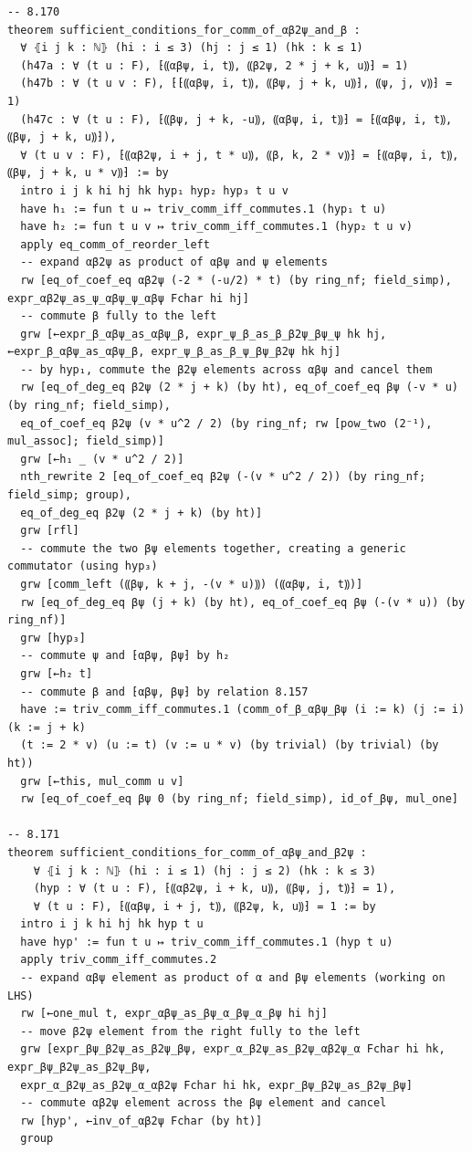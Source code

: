 \begin{Verbatim}
-- 8.170
theorem sufficient_conditions_for_comm_of_αβ2ψ_and_β :
  ∀ ⦃i j k : ℕ⦄ (hi : i ≤ 3) (hj : j ≤ 1) (hk : k ≤ 1)
  (h47a : ∀ (t u : F), ⁅⸨αβψ, i, t⸩, ⸨β2ψ, 2 * j + k, u⸩⁆ = 1)
  (h47b : ∀ (t u v : F), ⁅⁅⸨αβψ, i, t⸩, ⸨βψ, j + k, u⸩⁆, ⸨ψ, j, v⸩⁆ = 1)
  (h47c : ∀ (t u : F), ⁅⸨βψ, j + k, -u⸩, ⸨αβψ, i, t⸩⁆ = ⁅⸨αβψ, i, t⸩, ⸨βψ, j + k, u⸩⁆),
  ∀ (t u v : F), ⁅⸨αβ2ψ, i + j, t * u⸩, ⸨β, k, 2 * v⸩⁆ = ⁅⸨αβψ, i, t⸩, ⸨βψ, j + k, u * v⸩⁆ := by
  intro i j k hi hj hk hyp₁ hyp₂ hyp₃ t u v
  have h₁ := fun t u ↦ triv_comm_iff_commutes.1 (hyp₁ t u)
  have h₂ := fun t u v ↦ triv_comm_iff_commutes.1 (hyp₂ t u v)
  apply eq_comm_of_reorder_left
  -- expand αβ2ψ as product of αβψ and ψ elements
  rw [eq_of_coef_eq αβ2ψ (-2 * (-u/2) * t) (by ring_nf; field_simp), expr_αβ2ψ_as_ψ_αβψ_ψ_αβψ Fchar hi hj]
  -- commute β fully to the left
  grw [←expr_β_αβψ_as_αβψ_β, expr_ψ_β_as_β_β2ψ_βψ_ψ hk hj, ←expr_β_αβψ_as_αβψ_β, expr_ψ_β_as_β_ψ_βψ_β2ψ hk hj]
  -- by hyp₁, commute the β2ψ elements across αβψ and cancel them
  rw [eq_of_deg_eq β2ψ (2 * j + k) (by ht), eq_of_coef_eq βψ (-v * u) (by ring_nf; field_simp),
  eq_of_coef_eq β2ψ (v * u^2 / 2) (by ring_nf; rw [pow_two (2⁻¹), mul_assoc]; field_simp)]
  grw [←h₁ _ (v * u^2 / 2)]
  nth_rewrite 2 [eq_of_coef_eq β2ψ (-(v * u^2 / 2)) (by ring_nf; field_simp; group),
  eq_of_deg_eq β2ψ (2 * j + k) (by ht)]
  grw [rfl]
  -- commute the two βψ elements together, creating a generic commutator (using hyp₃)
  grw [comm_left (⸨βψ, k + j, -(v * u)⸩) (⸨αβψ, i, t⸩)]
  rw [eq_of_deg_eq βψ (j + k) (by ht), eq_of_coef_eq βψ (-(v * u)) (by ring_nf)]
  grw [hyp₃]
  -- commute ψ and ⁅αβψ, βψ⁆ by h₂
  grw [←h₂ t]
  -- commute β and ⁅αβψ, βψ⁆ by relation 8.157
  have := triv_comm_iff_commutes.1 (comm_of_β_αβψ_βψ (i := k) (j := i) (k := j + k)
  (t := 2 * v) (u := t) (v := u * v) (by trivial) (by trivial) (by ht))
  grw [←this, mul_comm u v]
  rw [eq_of_coef_eq βψ 0 (by ring_nf; field_simp), id_of_βψ, mul_one]

-- 8.171
theorem sufficient_conditions_for_comm_of_αβψ_and_β2ψ :
    ∀ ⦃i j k : ℕ⦄ (hi : i ≤ 1) (hj : j ≤ 2) (hk : k ≤ 3)
    (hyp : ∀ (t u : F), ⁅⸨αβ2ψ, i + k, u⸩, ⸨βψ, j, t⸩⁆ = 1),
    ∀ (t u : F), ⁅⸨αβψ, i + j, t⸩, ⸨β2ψ, k, u⸩⁆ = 1 := by
  intro i j k hi hj hk hyp t u
  have hyp' := fun t u ↦ triv_comm_iff_commutes.1 (hyp t u)
  apply triv_comm_iff_commutes.2
  -- expand αβψ element as product of α and βψ elements (working on LHS)
  rw [←one_mul t, expr_αβψ_as_βψ_α_βψ_α_βψ hi hj]
  -- move β2ψ element from the right fully to the left
  grw [expr_βψ_β2ψ_as_β2ψ_βψ, expr_α_β2ψ_as_β2ψ_αβ2ψ_α Fchar hi hk, expr_βψ_β2ψ_as_β2ψ_βψ,
  expr_α_β2ψ_as_β2ψ_α_αβ2ψ Fchar hi hk, expr_βψ_β2ψ_as_β2ψ_βψ]
  -- commute αβ2ψ element across the βψ element and cancel
  rw [hyp', ←inv_of_αβ2ψ Fchar (by ht)]
  group


\end{Verbatim}
